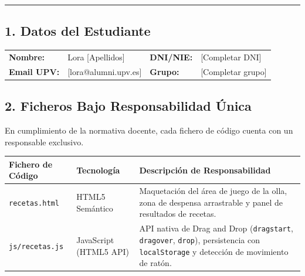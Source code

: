 \documentclass[11pt,a4paper]{article}
\begin{document}
\vspace{0.3cm}
\hrule
\vspace{0.4cm}

\subsection*{1. Datos del Estudiante}
\begin{tabularx}{\textwidth}{l X l X}
    \textbf{Nombre:} & Lora [Apellidos] & \textbf{DNI/NIE:} & [Completar DNI] \\
    \textbf{Email UPV:} & [lora@alumni.upv.es] & \textbf{Grupo:} & [Completar grupo] \\
\end{tabularx}

\vspace{0.4cm}
\subsection*{2. Ficheros Bajo Responsabilidad Única}
En cumplimiento de la normativa docente, cada fichero de código cuenta con un responsable exclusivo.
\begin{table}[h!]
\centering
\small
\begin{tabularx}{\textwidth}{p{4cm} p{3.5cm} X}
\toprule
\textbf{Fichero de Código} & \textbf{Tecnología} & \textbf{Descripción de Responsabilidad} \\
\midrule
\texttt{recetas.html} & HTML5 Semántico & Maquetación del área de juego de la olla, zona de despensa arrastrable y panel de resultados de recetas. \\
\addlinespace
\texttt{js/recetas.js} & JavaScript (HTML5 API) & API nativa de Drag and Drop (\texttt{dragstart}, \texttt{dragover}, \texttt{drop}), persistencia con \texttt{localStorage} y detección de movimiento de ratón. \\
\bottomrule
\end{tabularx}
\end{table}
\end{document}
